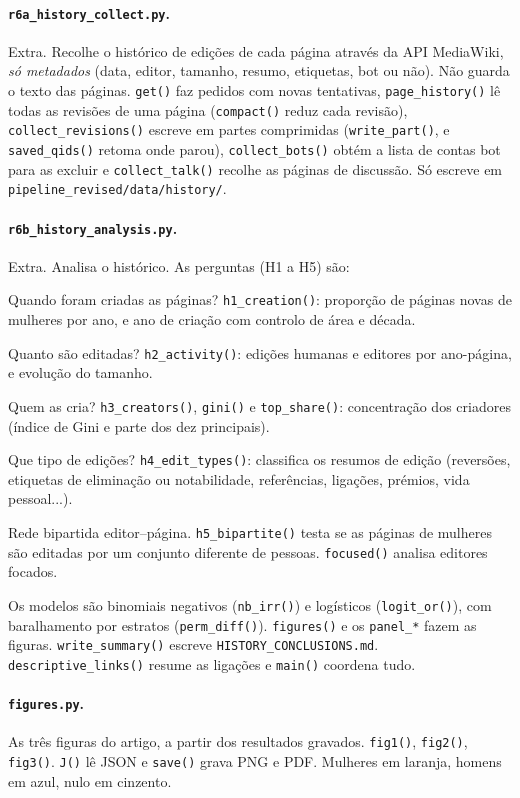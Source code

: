 \documentclass[11pt,a4paper]{article}
\newcommand{\file}[1]{\texttt{#1}}
\newcommand{\fn}[1]{\texttt{#1()}}
\begin{document}
\paragraph{\file{r6a_history_collect.py}.} Extra. Recolhe o histórico de edições de cada página através da API MediaWiki, \emph{só metadados} (data, editor, tamanho, resumo, etiquetas, bot ou não). Não guarda o texto das páginas. \fn{get} faz pedidos com novas tentativas, \fn{page_history} lê todas as revisões de uma página (\fn{compact} reduz cada revisão), \fn{collect_revisions} escreve em partes comprimidas (\fn{write_part}, e \fn{saved_qids} retoma onde parou), \fn{collect_bots} obtém a lista de contas bot para as excluir e \fn{collect_talk} recolhe as páginas de discussão. Só escreve em \file{pipeline_revised/data/history/}.

\paragraph{\file{r6b_history_analysis.py}.} Extra. Analisa o histórico. As perguntas (H1 a H5) são:
\begin{description}[leftmargin=1.2cm,style=nextline]
  \item[H1] Quando foram criadas as páginas? \fn{h1_creation}: proporção de páginas novas de mulheres por ano, e ano de criação com controlo de área e década.
  \item[H2] Quanto são editadas? \fn{h2_activity}: edições humanas e editores por ano-página, e evolução do tamanho.
  \item[H3] Quem as cria? \fn{h3_creators}, \fn{gini} e \fn{top_share}: concentração dos criadores (índice de Gini e parte dos dez principais).
  \item[H4] Que tipo de edições? \fn{h4_edit_types}: classifica os resumos de edição (reversões, etiquetas de eliminação ou notabilidade, referências, ligações, prémios, vida pessoal...).
  \item[H5] Rede bipartida editor--página. \fn{h5_bipartite} testa se as páginas de mulheres são editadas por um conjunto diferente de pessoas. \fn{focused} analisa editores focados.
\end{description}
Os modelos são binomiais negativos (\fn{nb_irr}) e logísticos (\fn{logit_or}), com baralhamento por estratos (\fn{perm_diff}). \fn{figures} e os \texttt{panel\_*} fazem as figuras. \fn{write_summary} escreve \file{HISTORY_CONCLUSIONS.md}. \fn{descriptive_links} resume as ligações e \fn{main} coordena tudo.

\paragraph{\file{figures.py}.} As três figuras do artigo, a partir dos resultados gravados. \fn{fig1}, \fn{fig2}, \fn{fig3}. \fn{J} lê JSON e \fn{save} grava PNG e PDF. Mulheres em laranja, homens em azul, nulo em cinzento.
\end{document}
